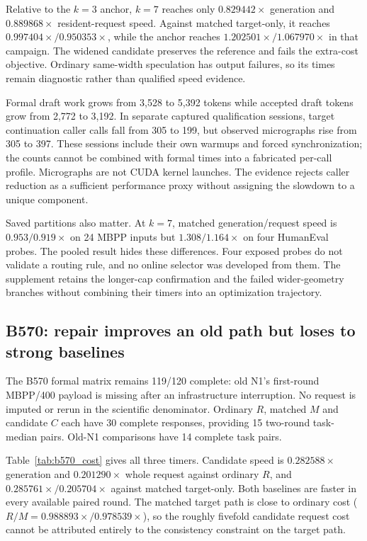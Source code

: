 Relative to the $k=3$ anchor, $k=7$ reaches only $0.829442\times$ generation and $0.889868\times$ resident-request speed. Against matched target-only, it reaches $0.997404\times/0.950353\times$, while the anchor reaches $1.202501\times/1.067970\times$ in that campaign. The widened candidate preserves the reference and fails the extra-cost objective. Ordinary same-width speculation has output failures, so its times remain diagnostic rather than qualified speed evidence.

Formal draft work grows from 3,528 to 5,392 tokens while accepted draft tokens grow from 2,772 to 3,192. In separate captured qualification sessions, target continuation caller calls fall from 305 to 199, but observed micrographs rise from 305 to 397. These sessions include their own warmups and forced synchronization; the counts cannot be combined with formal times into a fabricated per-call profile. Micrographs are not CUDA kernel launches. The evidence rejects caller reduction as a sufficient performance proxy without assigning the slowdown to a unique component.

Saved partitions also matter. At $k=7$, matched generation/request speed is $0.953/0.919\times$ on 24 MBPP inputs but $1.308/1.164\times$ on four HumanEval probes. The pooled result hides these differences. Four exposed probes do not validate a routing rule, and no online selector was developed from them. The supplement retains the longer-cap confirmation and the failed wider-geometry branches without combining their timers into an optimization trajectory.

\subsection{B570: repair improves an old path but loses to strong baselines}
The B570 formal matrix remains 119/120 complete: old N1's first-round MBPP/400 payload is missing after an infrastructure interruption. No request is imputed or rerun in the scientific denominator. Ordinary $R$, matched $M$ and candidate $C$ each have 30 complete responses, providing 15 two-round task-median pairs. Old-N1 comparisons have 14 complete task pairs.

Table~\ref{tab:b570_cost} gives all three timers. Candidate speed is $0.282588\times$ generation and $0.201290\times$ whole request against ordinary $R$, and $0.285761\times/0.205704\times$ against matched target-only. Both baselines are faster in every available paired round. The matched target path is close to ordinary cost ($R/M=0.988893\times/0.978539\times$), so the roughly fivefold candidate request cost cannot be attributed entirely to the consistency constraint on the target path.

